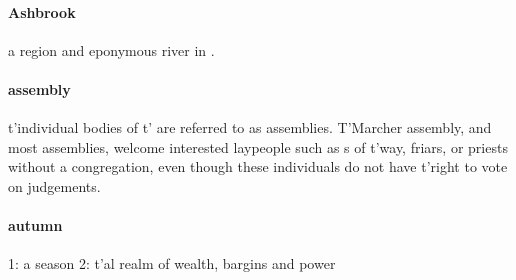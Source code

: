 \paragraph{Ashbrook} a region and eponymous river in .
\paragraph{assembly} t'\allowbreak individual bodies of t'\allowbreak {} are referred to as assemblies. T'Marcher assembly, and most  assemblies, welcome interested laypeople such as s of t'\allowbreak way, friars, or priests without a congregation, even though these individuals do not have t'\allowbreak right to vote on judgements.
\paragraph{autumn} 1: a season 2: t'\allowbreak {}al realm of wealth, bargins and power 
